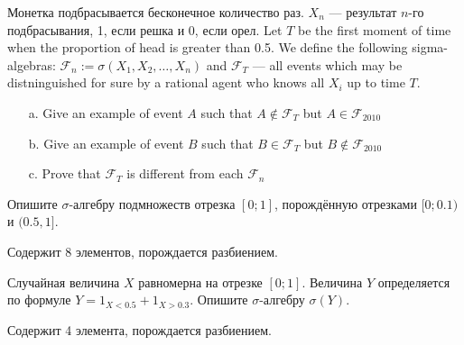 \begin{problem}
Монетка подбрасывается бесконечное количество раз. $ X_{n} $ — результат $ n $-го подбрасывания, 1, если решка и 0, если орел. Let $T$ be the first moment of time when the proportion of head is greater than 0.5. We define the following sigma-algebras: $ \mathcal{F}_{n}:=\sigma(X_{1},X_{2},\ldots,X_{n})$ and $ \mathcal{F}_{T} $ — all events which may be distninguished for sure by a rational agent who knows all $ X_{i} $ up to time $ T $.
\begin{enumerate}
\item[a.] Give an example of event $A$ such that $ A\notin \mathcal{F}_{T} $ but $ A\in \mathcal{F}_{2010} $
\item[b.] Give an example of event $B$ such that $ B\in \mathcal{F}_{T} $ but $ B\notin \mathcal{F}_{2010} $
\item[c.] Prove that $ \mathcal{F}_{T} $ is different from each $ \mathcal{F}_{n} $
\end{enumerate}


\begin{sol}

\end{sol}
\end{problem}

\begin{problem}
Опишите $\sigma$-алгебру подмножеств отрезка $[0;1]$, порождённую отрезками $[0;0.1)$ и $(0.5,1]$.

\begin{sol}
Содержит 8 элементов, порождается разбиением.
\end{sol}
\end{problem}

\begin{problem}
Случайная величина $X$ равномерна на отрезке $[0;1]$. Величина $Y$ определяется по формуле $Y=1_{X<0.5}+1_{X>0.3}$. Опишите $\sigma$-алгебру $\sigma(Y)$.

\begin{sol}
Содержит 4 элемента, порождается разбиением.
\end{sol}
\end{problem}


